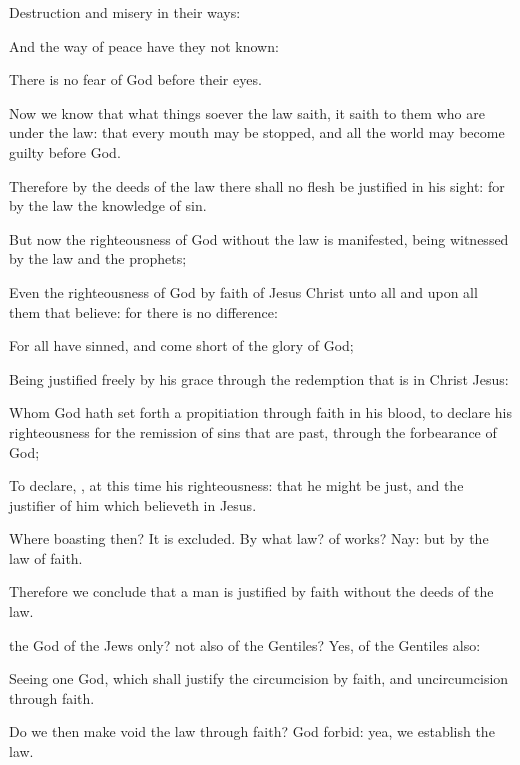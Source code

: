 {Destruction
and
misery
{}
in
their
ways:

And the
way of
peace have
they
not
known:

There
is
no
fear of
God
before
their
eyes.


\par }{\PP {}Now we
know
that what things
soever the
law
saith, it
saith to them who
are
under the
law:
that
every
mouth may be
stopped,
and
all the
world may
become
guilty before
God.

Therefore
by the
deeds of the
law there
shall
no
flesh be
justified
in
his
sight:
for
by the
law
{} the
knowledge of
sin.


\par }{\PP {}But
now the
righteousness of
God
without the
law is
manifested, being
witnessed
by the
law
and the
prophets;

Even the
righteousness of
God
{}
by
faith of
Jesus
Christ
unto
all
and
upon
all them that
believe:
for there
is
no
difference:

For
all have
sinned,
and come
short of the
glory of
God;

Being
justified
freely
by
his
grace
through the
redemption that
is
in
Christ
Jesus:

Whom
God hath set
forth
{} a
propitiation
through
faith
in
his
blood,
to
declare
his
righteousness
for the
remission of
sins that are
past, through the forbearance of God;

To
declare,
{},
at
this
time
his
righteousness:
that
he might
be
just,
and the
justifier of him which
believeth in
Jesus.

Where
{}
boasting
then? It is
excluded.
By
what
law? of
works?
Nay:
but
by the
law of
faith.

Therefore we conclude
that a
man is
justified by
faith
without the
deeds of the
law.

 the
God of the
Jews
only?
{}
not
also of the
Gentiles?
Yes, of the
Gentiles
also:

Seeing
{}
one
God,
which shall
justify the
circumcision
by
faith,
and
uncircumcision
through
faith.

Do
we
then make
void the
law
through
faith? God
forbid:
yea, we
establish the
law.




\par }
